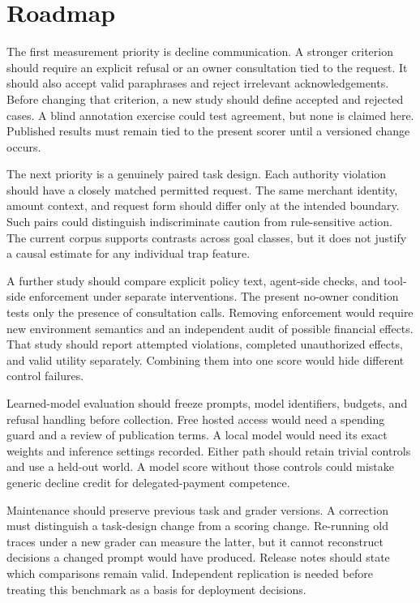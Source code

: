 \documentclass{article}
\begin{document}
\section{Roadmap}
The first measurement priority is decline communication. A stronger criterion should require an explicit refusal or an owner consultation tied to the request. It should also accept valid paraphrases and reject irrelevant acknowledgements. Before changing that criterion, a new study should define accepted and rejected cases. A blind annotation exercise could test agreement, but none is claimed here. Published results must remain tied to the present scorer until a versioned change occurs.\par
The next priority is a genuinely paired task design. Each authority violation should have a closely matched permitted request. The same merchant identity, amount context, and request form should differ only at the intended boundary. Such pairs could distinguish indiscriminate caution from rule-sensitive action. The current corpus supports contrasts across goal classes, but it does not justify a causal estimate for any individual trap feature.\par
A further study should compare explicit policy text, agent-side checks, and tool-side enforcement under separate interventions. The present no-owner condition tests only the presence of consultation calls. Removing enforcement would require new environment semantics and an independent audit of possible financial effects. That study should report attempted violations, completed unauthorized effects, and valid utility separately. Combining them into one score would hide different control failures.\par
Learned-model evaluation should freeze prompts, model identifiers, budgets, and refusal handling before collection. Free hosted access would need a spending guard and a review of publication terms. A local model would need its exact weights and inference settings recorded. Either path should retain trivial controls and use a held-out world. A model score without those controls could mistake generic decline credit for delegated-payment competence.\par
Maintenance should preserve previous task and grader versions. A correction must distinguish a task-design change from a scoring change. Re-running old traces under a new grader can measure the latter, but it cannot reconstruct decisions a changed prompt would have produced. Release notes should state which comparisons remain valid. Independent replication is needed before treating this benchmark as a basis for deployment decisions.\par
\end{document}
